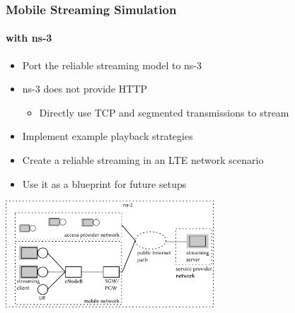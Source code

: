 \documentclass{beamer}
\begin{document}
\begin{frame}
	\frametitle{Mobile Streaming Simulation}
	\framesubtitle{with ns-3}

	\begin{itemize}
		\item Port the reliable streaming model to ns-3
		\item ns-3 does not provide HTTP
			\begin{itemize}
				\item Directly use TCP and segmented transmissions to stream
			\end{itemize}
		\item Implement example playback strategies
		\item Create a reliable streaming in an LTE network scenario
		\item Use it as a blueprint for future setups
	\end{itemize}

	\begin{center}
		\includegraphics[height=4cm]{extras/streaming-simulation.pdf}
	\end{center}

\end{frame}
\end{document}
